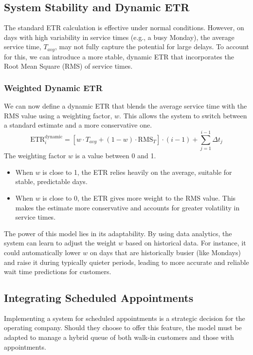 \documentclass[12pt,a4paper]{report}
\begin{document}
\subsection{System Stability and Dynamic ETR}
The standard ETR calculation is effective under normal conditions. However, on days with high variability in service times (e.g., a busy Monday), the average service time, $T_{avg}$, may not fully capture the potential for large delays. To account for this, we can introduce a more stable, dynamic ETR that incorporates the Root Mean Square (RMS) of service times.

\subsubsection{Weighted Dynamic ETR}
We can now define a dynamic ETR that blends the average service time with the RMS value using a weighting factor, $w$. This allows the system to switch between a standard estimate and a more conservative one.
\begin{equation}
    \text{ETR}_i^{\text{dynamic}} = \left[ w \cdot T_{avg} + (1 - w) \cdot \text{RMS}_T \right] \cdot (i - 1) + \sum_{j=1}^{i-1} \Delta t_j
\end{equation}
The weighting factor $w$ is a value between 0 and 1.
\begin{itemize}
    \item When $w$ is close to 1, the ETR relies heavily on the average, suitable for stable, predictable days.
    \item When $w$ is close to 0, the ETR gives more weight to the RMS value. This makes the estimate more conservative and accounts for greater volatility in service times.
\end{itemize}
The power of this model lies in its adaptability. By using data analytics, the system can learn to adjust the weight $w$ based on historical data. For instance, it could automatically lower $w$ on days that are historically busier (like Mondays) and raise it during typically quieter periods, leading to more accurate and reliable wait time predictions for customers.

\subsection{Integrating Scheduled Appointments}
Implementing a system for scheduled appointments is a strategic decision for the operating company. Should they choose to offer this feature, the model must be adapted to manage a hybrid queue of both walk-in customers and those with appointments. 
\end{document}

